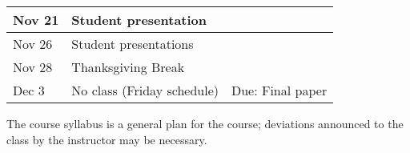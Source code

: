 \documentclass[12pt]{article}
\begin{document}
\begin{center}
\begin{tabular}[c]{lll}
Nov 21     & Student presentation                           &                                                       \\
\hline
Nov 26     & Student presentations                        &                                                       \\
Nov 28     & Thanksgiving Break                        &                                                       \\
\hline
Dec 3      & No class (Friday schedule)                   & Due: Final paper                                      \\
\hline \hline
\end{tabular}
\end{center}

The course syllabus is a general plan for the course; deviations announced to the class by the instructor may be necessary.
\end{document}
